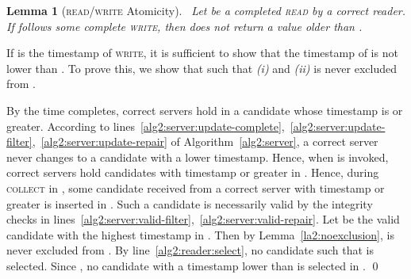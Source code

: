 \documentclass[10pt,conference,compsocconf]{IEEEtran}
\newtheorem{la}[defn]{Lemma}
\newenvironment{prooff}{\vspace{1ex}\noindent{\bf Proof:}\hspace{0.5em}}
	{\hfill\qed\vspace{1em}}
\begin{document}
\begin{la}[\textsc{read}/\textsc{write} Atomicity]~\label{la2:rwatomic}
Let  be a completed \textsc{read} by a correct reader. If  follows some complete \textsc{write}, then  does not return a value older than .
\end{la}
\begin{prooff}
If  is the timestamp of \textsc{write}, it is sufficient to show that the timestamp of  is not lower than . To prove this, we show that  such that \emph{(i)}  and \emph{(ii)}  is never excluded from .

By the time  completes,  correct servers hold in  a candidate whose timestamp is  or greater. According to lines~\ref{alg2:server:update-complete},~\ref{alg2:server:update-filter},~\ref{alg2:server:update-repair} of Algorithm~\ref{alg2:server}, a correct server never changes  to a candidate with a lower timestamp. Hence, when  is invoked,  correct servers hold candidates with timestamp  or greater in . Hence, during \textsc{collect} in , some candidate received from a correct server with timestamp  or greater is inserted in . Such a candidate is necessarily valid by the integrity checks in lines~\ref{alg2:server:valid-filter},~\ref{alg2:server:valid-repair}. Let  be the valid candidate with the highest timestamp in . Then by Lemma~\ref{la2:noexclusion},  is never excluded from . By line~\ref{alg2:reader:select}, no candidate  such that  is selected. Since , no candidate with a timestamp lower than  is selected in .
\end{prooff}
\end{document}
